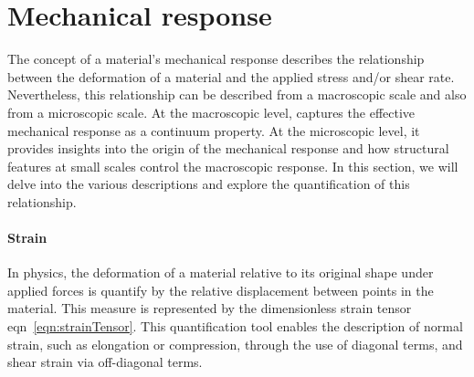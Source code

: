 \section{Mechanical response}

The concept of a material's mechanical response describes the relationship between the deformation of a material and the applied stress and/or shear rate.
Nevertheless, this relationship can be described from a macroscopic scale and also from a microscopic scale.
At the macroscopic level, captures the effective mechanical response as a continuum property. 
At the microscopic level, it provides insights into the origin of the mechanical response and how structural features at small scales control the macroscopic response.
In this section, we will delve into the various descriptions and explore the quantification of this relationship.

\paragraph{Strain} In physics, the deformation of a material relative to its original shape under applied forces is quantify by the relative displacement between points in the material.
This measure is represented by the dimensionless strain tensor eqn~\eqref{eqn:strainTensor}.
This quantification tool enables the description of normal strain, such as elongation or compression, through the use of diagonal terms, and shear strain via off-diagonal terms.

